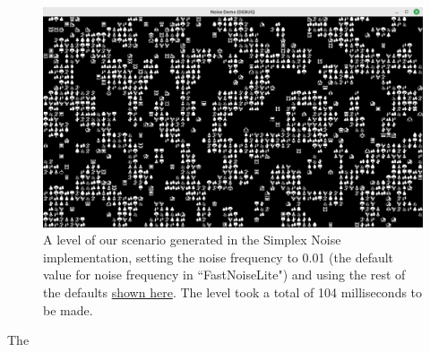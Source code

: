 \begin{figure}[H]
    \centering
    \includegraphics[width=\textwidth]{Images/simplex_smooth_0.01_frequency.png}
    \caption{A level of our scenario generated in the Simplex Noise implementation, setting the noise frequency to 0.01 (the default value for noise frequency in ``FastNoiseLite") and using the rest of the defaults \hyperref[noisedefaults]{shown here}. The level took a total of 104 milliseconds to be made.}
    \label{fig:simplexsmooth0.01}
\end{figure}

The 